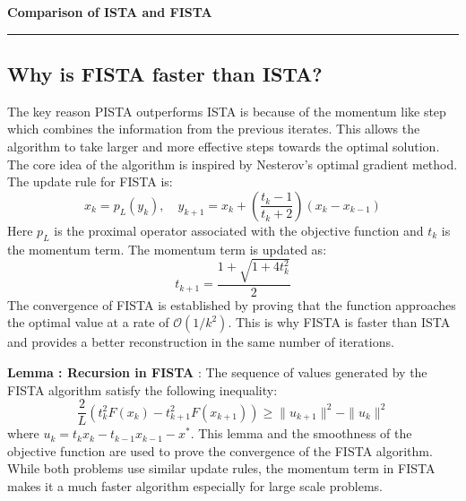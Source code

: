 \documentclass[a4paper,12pt]{article}
\newenvironment{solution}[2][]{%
    \begin{mdframed}[linecolor=blue!70!black, linewidth=2pt, roundcorner=10pt, backgroundcolor=yellow!10!white, skipabove=12pt, skipbelow=12pt]%
        \textbf{\large #2}
        \par\noindent\rule{\textwidth}{0.4pt}
}{
    \end{mdframed}
}
\begin{document}
\begin{solution}{Comparison of ISTA and FISTA}
  \subsection{Why is FISTA faster than ISTA?}
  The key reason PISTA outperforms ISTA is because of the momentum like step which combines the information from the previous iterates. This allows the algorithm to take larger and more effective steps towards the optimal solution. The core idea of the algorithm is inspired by Nesterov's optimal gradient method. The update rule for FISTA is:
  \begin{equation}
    x_k = p_L(y_k), \quad y_{k + 1} = x_k + \left( \displaystyle\frac{t_k - 1}{t_k + 2}\right) (x_k - x_{k-1})
  \end{equation}
  \noindent Here $p_L$ is the proximal operator associated with the objective function and $t_k$ is the momentum term. The momentum term is updated as:
  \begin{equation}
    t_{k+1} = \displaystyle\frac{1 + \sqrt{1 + 4t_k^2}}{2}
  \end{equation}
  \noindent The convergence of FISTA is established by proving that the function approaches the optimal value at a rate of $\mathcal{O}(1/k^2)$. This is why FISTA is faster than ISTA and provides a better reconstruction in the same number of iterations.

  \noindent \textbf{Lemma : Recursion in FISTA} : The sequence of values generated by the FISTA algorithm satisfy the following inequality:
  \begin{equation}
    \frac{2}{L} \left( t_k^2 F(x_k) - t_{k+1}^2 F(x_{k+1}) \right) \geq \| u_{k+1} \|^2 - \| u_k \|^2
  \end{equation}
  \noindent where \( u_k = t_k x_k - t_{k-1} x_{k-1} - x^*\). This lemma and the smoothness of the objective function are used to prove the convergence of the FISTA algorithm. While both problems use similar update rules, the momentum term in FISTA makes it a much faster algorithm especially for large scale problems.
\end{solution}
\end{document}
